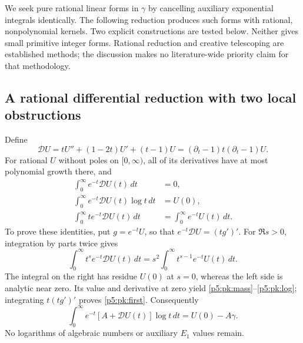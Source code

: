 \documentclass[11pt,a4paper]{article}
\theoremstyle{definition}
\theoremstyle{remark}
\numberwithin{equation}{section}
\begin{document}
We seek pure rational linear forms in $\gamma$ by cancelling auxiliary
exponential integrals identically. The following reduction produces such
forms with rational, nonpolynomial kernels. Two explicit constructions are
tested below. Neither gives small primitive integer forms. Rational
reduction and creative telescoping are established methods; the discussion
makes no literature-wide priority claim for that methodology.

\subsection{A rational differential reduction with two local obstructions}
Define
\[
 \mathcal D U=tU''+(1-2t)U'+(t-1)U
       =(\partial_t-1)t(\partial_t-1)U.
\]
For rational $U$ without poles on $[0,\infty)$, all of its derivatives have
at most polynomial growth there, and
\begin{align}
 \int_0^\infty e^{-t}\mathcal D U(t)\,dt&=0,\label{p5:pk:mass}\\
 \int_0^\infty e^{-t}\mathcal D U(t)\log t\,dt&=U(0),\label{p5:pk:log}\\
 \int_0^\infty te^{-t}\mathcal D U(t)\,dt
       &=\int_0^\infty e^{-t}U(t)\,dt.\label{p5:pk:first}
\end{align}
To prove these identities, put $g=e^{-t}U$, so that
$e^{-t}\mathcal D U=(tg')'$. For $\Re s>0$, integration by parts twice gives
\[
 \int_0^\infty t^s e^{-t}\mathcal D U(t)\,dt
       =s^2\int_0^\infty t^{s-1}e^{-t}U(t)\,dt.
\]
The integral on the right has residue $U(0)$ at $s=0$, whereas the left
side is analytic near zero. Its value and derivative at zero yield
\eqref{p5:pk:mass}--\eqref{p5:pk:log}; integrating $t(tg')'$ proves
\eqref{p5:pk:first}. Consequently
\begin{equation}
 \boxed{\int_0^\infty e^{-t}[A+\mathcal D U(t)]\log t\,dt
                 =U(0)-A\gamma.}\label{p5:pk:pure}
\end{equation}
No logarithms of algebraic numbers or auxiliary $E_1$ values remain.
\end{document}
